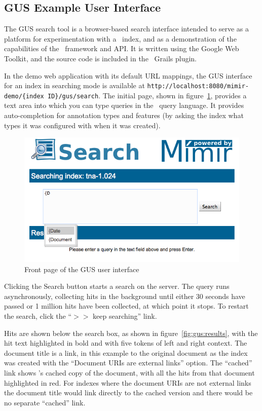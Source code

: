 \subsection{GUS Example User Interface}\label{sec:search:gus}

The GUS search tool is a browser-based search interface intended to serve as a
platform for experimentation with a \Mimir\ index, and as a demonstration of
the capabilities of the \Mimir\ framework and API.  It is written using the
Google Web Toolkit, and the source code is included in the \Mimir\ Grails
plugin.

In the demo web application with its default URL mappings, the GUS interface
for an index in searching mode is available at 
{\tt http://localhost:8080/mimir-demo/\{index ID\}/gus/search}.  The initial
page, shown in figure~\ref{fig:gus:front-page}, provides a text area into which
you can type queries in the \Mimir\ query language.  It provides
auto-completion for annotation types and features (by asking the index what
types it was configured with when it was created).

\begin{figure}[tbp]
\begin{center}
\includegraphics[scale=0.5]{img/gus-front-page}
\caption{Front page of the GUS user interface}
\label{fig:gus:front-page}
\end{center}
\end{figure}

Clicking the Search button starts a search on the server.  The query runs
asynchronously, collecting hits in the background until either 30 seconds have
passed or 1 million hits have been collected, at which point it stops.  To
restart the search, click the ``$>>$ keep searching'' link.

Hits are shown below the search box, as shown in figure~\ref{fig:gus:results},
with the hit text highlighted in bold and with five tokens of left and right
context.  The document title is a link, in this example to the original
document as the index was created with the ``Document URIs are external links''
option.  The ``cached'' link shows \Mimir's cached copy of the document, with
all the hits from that document highlighted in red.  For indexes where the
document URIs are not external links the document title would link directly to
the cached version and there would be no separate ``cached'' link.

